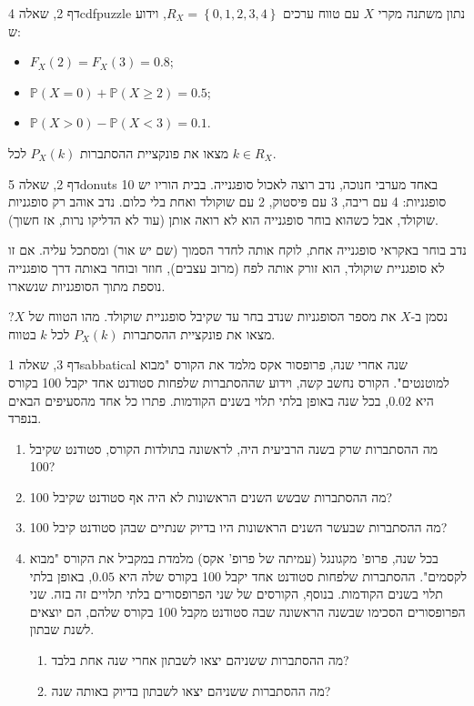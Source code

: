 \documentclass[11pt,a4paper]{report}
\newcommand{\set}[1]{\left\{#1\right\}}
\newcommand{\PP}{\mathbb{P}}
\begin{document}

\begin{exercise}{דף 2, שאלה 4}{cdfpuzzle}
נתון משתנה מקרי $X$ עם טווח ערכים $R_X=\set{0,1,2,3,4}$, וידוע ש:
\begin{itemize}
  \item $F_X(2)=F_X(3)=0.8$;
  \item $\PP(X=0)+\PP(X\ge2)=0.5$;
  \item $\PP(X>0)-\PP(X<3)=0.1$.
\end{itemize}
מצאו את פונקציית ההסתברות $P_X(k)$ לכל $k\in R_X$.
\end{exercise}

\begin{exercise}{דף 2, שאלה 5}{donuts}
באחד מערבי חנוכה, נדב רוצה לאכול סופגנייה. בבית הוריו יש 10 סופגניות: 4 עם ריבה, 3 עם פיסטוק, 2 עם שוקולד ואחת בלי כלום. נדב אוהב רק סופגניות שוקולד, אבל כשהוא בוחר סופגנייה הוא לא רואה אותן (עוד לא הדליקו נרות, אז חשוך).

נדב בוחר באקראי סופגנייה אחת, לוקח אותה לחדר הסמוך (שם יש אור) ומסתכל עליה. אם זו לא סופגניית שוקולד, הוא זורק אותה לפח (מרוב עצבים), חוזר ובוחר באותה דרך סופגנייה נוספת מתוך הסופגניות שנשארו.

נסמן ב-$X$ את מספר הסופגניות שנדב בחר עד שקיבל סופגניית שוקולד. מהו הטווח של $X$? מצאו את פונקציית ההסתברות $P_X(k)$ לכל $k$ בטווח.
\end{exercise}

\begin{exercise}{דף 3, שאלה 1}{sabbatical}
שנה אחרי שנה, פרופסור אקס מלמד את הקורס "מבוא למוטנטים". הקורס נחשב קשה, וידוע שההסתברות שלפחות סטודנט אחד יקבל 100 בקורס היא $0.02$, בכל שנה באופן בלתי תלוי בשנים הקודמות. פתרו כל אחד מהסעיפים הבאים בנפרד.
\begin{enumerate}[label=(\alph*)]
  \item מה ההסתברות שרק בשנה הרביעית היה, לראשונה בתולדות הקורס, סטודנט שקיבל 100?
  \item מה ההסתברות שבשש השנים הראשונות לא היה אף סטודנט שקיבל 100?
  \item מה ההסתברות שבעשר השנים הראשונות היו בדיוק שנתיים שבהן סטודנט קיבל 100?
  \item בכל שנה, פרופ' מקגונגל (עמיתה של פרופ' אקס) מלמדת במקביל את הקורס "מבוא לקסמים". ההסתברות שלפחות סטודנט אחד יקבל 100 בקורס שלה היא $0.05$, באופן בלתי תלוי בשנים הקודמות. בנוסף, הקורסים של שני הפרופסורים בלתי תלויים זה בזה.
  שני הפרופסורים הסכימו שבשנה הראשונה שבה סטודנט מקבל 100 בקורס שלהם, הם יוצאים לשנת שבתון.
  \begin{enumerate}[label=(\roman*)]
    \item מה ההסתברות ששניהם יצאו לשבתון אחרי שנה אחת בלבד?
    \item מה ההסתברות ששניהם יצאו לשבתון בדיוק באותה שנה?
  \end{enumerate}
\end{enumerate}
\end{exercise}
\end{document}
